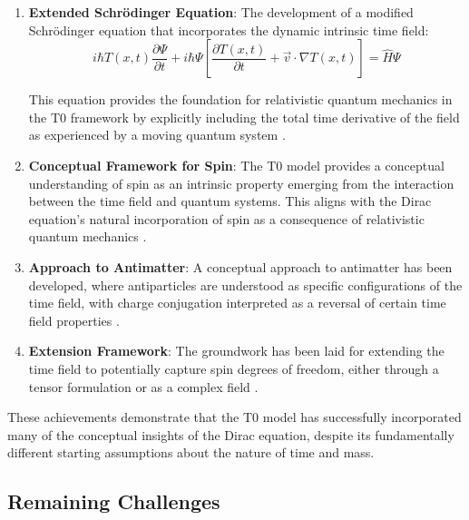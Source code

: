 \documentclass[12pt,a4paper]{article}
\newcommand{\Tfieldt}{T(x,t)}
\begin{document}
	\begin{enumerate}
		\item \textbf{Extended Schrödinger Equation}: The development of a modified Schrödinger equation that incorporates the dynamic intrinsic time field:
		\begin{equation}
			i\hbar \Tfieldt \frac{\partial\Psi}{\partial t} + i\hbar \Psi \left[\frac{\partial \Tfieldt}{\partial t} + \vec{v}\cdot\nabla\Tfieldt\right] = \hat{H} \Psi
			\label{eq:modified_schrodinger}
		\end{equation}
		
		This equation provides the foundation for relativistic quantum mechanics in the T0 framework by explicitly including the total time derivative of the field as experienced by a moving quantum system \cite{pascher_dynamic_timeField_2025}.
		
		\item \textbf{Conceptual Framework for Spin}: The T0 model provides a conceptual understanding of spin as an intrinsic property emerging from the interaction between the time field and quantum systems. This aligns with the Dirac equation's natural incorporation of spin as a consequence of relativistic quantum mechanics \cite{pascher_quantum_2025}.
		
		\item \textbf{Approach to Antimatter}: A conceptual approach to antimatter has been developed, where antiparticles are understood as specific configurations of the time field, with charge conjugation interpreted as a reversal of certain time field properties \cite{pascher_quantum_2025}.
		
		\item \textbf{Extension Framework}: The groundwork has been laid for extending the time field to potentially capture spin degrees of freedom, either through a tensor formulation or as a complex field \cite{pascher_dynamic_timeField_2025}.
	\end{enumerate}
	
	These achievements demonstrate that the T0 model has successfully incorporated many of the conceptual insights of the Dirac equation, despite its fundamentally different starting assumptions about the nature of time and mass.
	
	\subsection{Remaining Challenges}
	\label{subsec:challenges}
	
\end{document}
